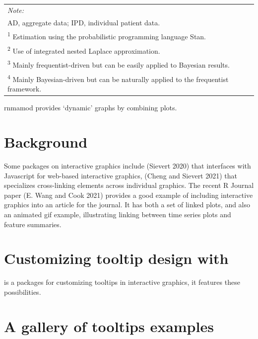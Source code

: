 \begin{table}
\begin{tabular}[t]{l|c|c|c|c|c|c|c|c}
\hline
\multicolumn{9}{l}{\rule{0pt}{1em}\textit{Note: }}\\
\multicolumn{9}{l}{\rule{0pt}{1em}AD, aggregate data; IPD, individual patient data.}\\
\multicolumn{9}{l}{\rule{0pt}{1em}\textsuperscript{1} Estimation using the probabilistic programming language Stan.}\\
\multicolumn{9}{l}{\rule{0pt}{1em}\textsuperscript{2} Use of integrated nested Laplace approximation.}\\
\multicolumn{9}{l}{\rule{0pt}{1em}\textsuperscript{3} Mainly frequentist-driven but can be easily applied to Bayesian results.}\\
\multicolumn{9}{l}{\rule{0pt}{1em}\textsuperscript{4} Mainly Bayesian-driven but can be naturally applied to the frequentist framework.}\\
\end{tabular}
\end{table}

rnmamod provides `dynamic' graphs by combining plots.

\hypertarget{background}{%
\section{Background}\label{background}}

Some packages on interactive graphics include  (Sievert 2020) that interfaces with Javascript for web-based interactive graphics,  (Cheng and Sievert 2021) that specializes cross-linking elements across individual graphics. The recent R Journal paper  (E. Wang and Cook 2021) provides a good example of including interactive graphics into an article for the journal. It has both a set of linked plots, and also an animated gif example, illustrating linking between time series plots and feature summaries.

\hypertarget{customizing-tooltip-design-with}{%
\section{\texorpdfstring{Customizing tooltip design with }{Customizing tooltip design with }}\label{customizing-tooltip-design-with}}

 is a packages for customizing tooltips in interactive graphics, it features these possibilities.

\hypertarget{a-gallery-of-tooltips-examples}{%
\section{A gallery of tooltips examples}\label{a-gallery-of-tooltips-examples}}

